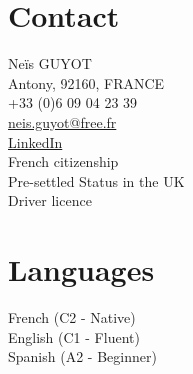 \documentclass[a4paper,10pt, sidebarwidth=0.4\paperwidth, sidecolor=gray!50]{article}
\begin{document}




\begin{minipage}{.2\linewidth}
\bigskip
\begin{flushleft}
\vspace{-67mm}
\color{blue}
\section{\normalsize{Contact}}
\smallskip
\color{black}
\small{Neïs GUYOT} \\
\smallskip
\small{Antony, 92160, FRANCE} \\
\smallskip
\small{+33 (0)6 09 04 23 39}\\
\smallskip
\href{mailto:neis.guyot@free.fr}{neis.guyot@free.fr}\\
\smallskip
\href{https://linkedin.com/in/neïs-guyot-3a4604173} {LinkedIn} \\
\smallskip
\small{French citizenship}\\
\small{Pre-settled Status in the UK}\\
\smallskip
\small{Driver licence}\\

\color{blue}
\section{\normalsize{Languages}}
\color{black}
\smallskip
\small
French (C2 - Native) \\
\smallskip
English (C1 - Fluent)\\
\smallskip
Spanish (A2 - Beginner)\\
\smallskip
\color{blue}

\end{flushleft}
\end{minipage}
\end{document}
